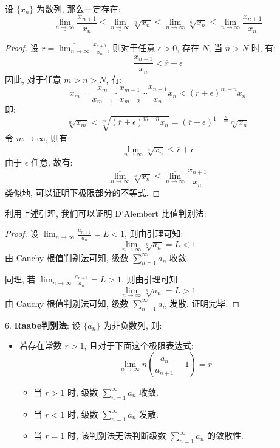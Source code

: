 \documentclass[a4paper,12pt]{ctexart}
\begin{document}
\begin{mylemma}{}{}
设 $\{x_n\}$ 为数列, 那么一定存在:
$$
\underline{\lim_{n \to \infty}} \frac{x_{n+1}}{x_n} \leq \underline{\lim_{n \to \infty}} \sqrt[n]{x_n} \leq \overline{\lim_{n \to \infty}} \sqrt[n]{x_n} \leq \overline{\lim_{n \to \infty}} \frac{x_{n+1}}{x_n}
$$
\end{mylemma}

\begin{proof}
设 $\overline{r} = \overline{\lim_{n \to \infty}} \frac{x_{n+1}}{x_n}$, 则对于任意 $\epsilon > 0$, 存在 $N$, 当 $n > N$ 时, 有:
$$
\frac{x_{n+1}}{x_n} < \overline{r} + \epsilon
$$
因此, 对于任意 $m > n > N$, 有:
$$
x_m = \frac{x_m}{x_{m-1}} \cdot \frac{x_{m-1}}{x_{m-2}} \cdots \frac{x_{n+1}}{x_n} x_n < (\overline{r} + \epsilon)^{m-n} x_n
$$
即:
$$
\sqrt[m]{x_m} < \sqrt[m]{(\overline{r} + \epsilon)^{m-n} x_n} = (\overline{r} + \epsilon)^{1 - \frac{n}{m}} \sqrt[m]{x_n}
$$
令 $m \to \infty$, 则有:
$$
\overline{\lim_{n \to \infty}} \sqrt[n]{x_n} \leq \overline{r} + \epsilon
$$
由于 $\epsilon$ 任意, 故有:
$$
\overline{\lim_{n \to \infty}} \sqrt[n]{x_n} \leq \overline{\lim_{n \to \infty}} \frac{x_{n+1}}{x_n}
$$
类似地, 可以证明下极限部分的不等式.
\end{proof}

利用上述引理, 我们可以证明 D'Alembert 比值判别法:

\begin{proof}
设 $\lim_{n \to \infty} \frac{a_{n+1}}{a_n} = L < 1$, 则由引理可知:
$$
\lim_{n \to \infty} \sqrt[n]{a_n} = L < 1
$$
由 Cauchy 根值判别法可知, 级数 $\sum_{n=1}^{\infty} a_n$ 收敛.

同理, 若 $\lim_{n \to \infty} \frac{a_{n+1}}{a_n} = L > 1$, 则由引理可知:
$$
\lim_{n \to \infty} \sqrt[n]{a_n} = L > 1
$$
由 Cauchy 根值判别法可知, 级数 $\sum_{n=1}^{\infty} a_n$ 发散. 证明完毕.
\end{proof}

6. \textbf{Raabe判别法}: 设 $\{a_n\}$ 为非负数列, 则:
   \begin{itemize}
       \item 若存在常数 $r > 1$, 且对于下面这个极限表达式:
   $$
   \lim_{n \to \infty} n \left( \frac{a_n}{a_{n+1}} - 1 \right) = r 
   $$
   \begin{itemize}
       \item 当 $r > 1$ 时, 级数 $\sum_{n=1}^{\infty} a_n$ 收敛.
       \item 当 $r < 1$ 时, 级数 $\sum_{n=1}^{\infty} a_n$ 发散.
       \item 当 $r = 1$ 时, 该判别法无法判断级数 $\sum_{n=1}^{\infty} a_n$ 的敛散性.
   \end{itemize}
   \end{itemize}
\end{document}
